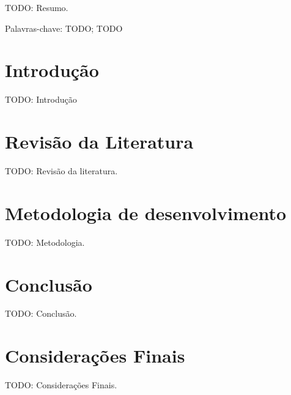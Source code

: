 \documentclass[chapter=TITLE,section=Title,espaco=duplo,tocpage=plain,appendix=Name,floatnumber=continuous]{abnt}
\begin{document}


\UTPCapa
\UTPFalsaFolhaDeRosto
\UTPFolhaDeRosto

\begin{resumo}
TODO: Resumo.

Palavras-chave: TODO; TODO
\end{resumo}

\listoffigures
\listoftables
\listadequadros
\sumario

\chapter{Introdução}

TODO: Introdução

\chapter{Revisão da Literatura}

TODO: Revisão da literatura.

\chapter{Metodologia de desenvolvimento}

TODO: Metodologia.

\chapter{Conclusão}

TODO: Conclusão.

\chapter{Considerações Finais}

TODO: Considerações Finais.


\end{document}
